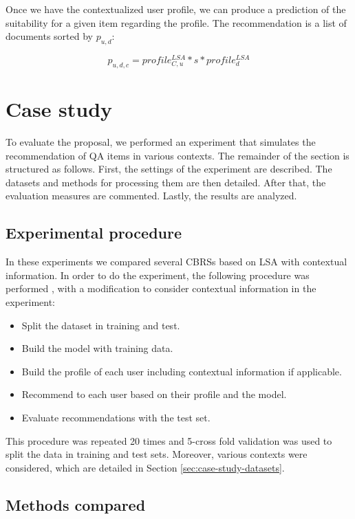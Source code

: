 \documentclass[preprint]{elsarticle}
\begin{document}
\begin{spacing}{1.5}
Once we have the contextualized user profile, we can produce a prediction of the suitability for a given item regarding the profile. The recommendation is a list of documents sorted by $p_{u,d}$:

\begin{equation}
	p_{u,d,c} = profile^{LSA}_{C,u}*s*profile^{LSA}_d
\end{equation}

\section{Case study}
\label{sec:case-study}

To evaluate the proposal, we performed an experiment that simulates the recommendation of QA items in various contexts. The remainder of the section is structured as follows. First, the settings of the experiment are described. The datasets and methods for processing them are then detailed. After that, the evaluation measures are commented. Lastly, the results are analyzed.

\subsection{Experimental procedure}

In these experiments we compared several CBRSs based on LSA with contextual information. In order to do the experiment, the following procedure was performed \cite{Sarwar2001}, with a modification to consider contextual information in the experiment:
\begin{itemize}
	\item Split the dataset in training and test.
	\item Build the model with training data.
	\item Build the profile of each user including contextual information if applicable.
	\item Recommend to each user based on their profile and the model.
	\item Evaluate recommendations with the test set.
\end{itemize}

This procedure was repeated 20 times and 5-cross fold validation was used to split the data in training and test sets. Moreover, various contexts were considered, which are detailed in Section \ref{sec:case-study-datasets}.

\subsection{Methods compared}


\end{spacing}
\end{document}

